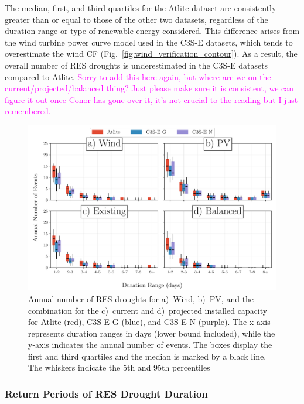 \documentclass[a4paper, 11pt]{article}
\begin{document}
The median, first, and third quartiles for the Atlite dataset are consistently greater than or equal to those of the other two datasets, regardless of the duration range or type of renewable energy considered. This difference arises from the wind turbine power curve model used in the C3S-E datasets, which tends to overestimate the wind CF (Fig.~\ref{fig:wind_verification_contour}). As a result, the overall number of RES droughts is underestimated in the C3S-E datasets compared to Atlite. \textcolor{magenta}{Sorry to add this here again, but where are we on the current/projected/balanced thing? Just please make sure it is consistent, we can figure it out once Conor has gone over it, it's not crucial to the reading but I just remembered.}

\begin{figure}[!ht]
	\centering
	\includegraphics[width=\textwidth]{droughts_number_events}
	\caption{Annual number of RES droughts for a)~Wind, b)~PV, and the combination for the c)~current and d)~projected installed capacity for Atlite (red), C3S-E G (blue), and C3S-E N (purple). The x-axis represents duration ranges in days (lower bound included), while the y-axis indicates the annual number of events. The boxes display the first and third quartiles and the median is marked by a black line. The whiskers indicate the 5th and 95th percentiles}
	\label{fig:boxplot_number_events}	
\end{figure}

\newpage
\subsubsection{Return Periods of RES Drought Duration}
\end{document}
